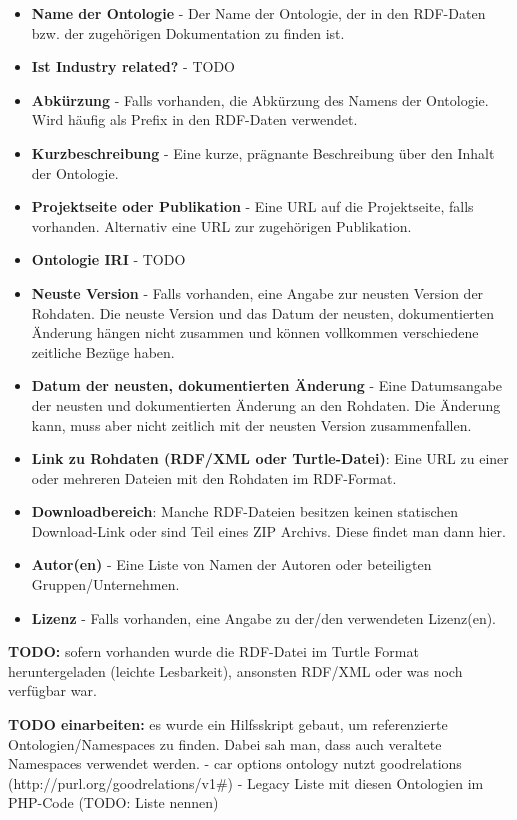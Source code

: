 \documentclass{article}
\begin{document}
\begin{itemize}
    \item \textbf{Name der Ontologie} - Der Name der Ontologie, der in den RDF-Daten bzw. der zugehörigen Dokumentation zu finden ist.
    \item \textbf{Ist Industry related?} - TODO
    \item \textbf{Abkürzung} - Falls vorhanden, die Abkürzung des Namens der Ontologie. Wird häufig als Prefix in den RDF-Daten verwendet.
    \item \textbf{Kurzbeschreibung} - Eine kurze, prägnante Beschreibung über den Inhalt der Ontologie.
    \item \textbf{Projektseite oder Publikation} - Eine URL auf die Projektseite, falls vorhanden. Alternativ eine URL zur zugehörigen Publikation.
    \item \textbf{Ontologie IRI} - TODO
    \item \textbf{Neuste Version} - Falls vorhanden, eine Angabe zur neusten Version der Rohdaten. Die neuste Version und das Datum der neusten, dokumentierten Änderung hängen nicht zusammen und können vollkommen verschiedene zeitliche Bezüge haben.
    \item \textbf{Datum der neusten, dokumentierten Änderung} - Eine Datumsangabe der neusten und dokumentierten Änderung an den Rohdaten. Die Änderung kann, muss aber nicht zeitlich mit der neusten Version zusammenfallen.
    \item \textbf{Link zu Rohdaten (RDF/XML oder Turtle-Datei)}: Eine URL zu einer oder mehreren Dateien mit den Rohdaten im RDF-Format.
    \item \textbf{Downloadbereich}: Manche RDF-Dateien besitzen keinen statischen Download-Link oder sind Teil eines ZIP Archivs. Diese findet man dann hier.
    \item \textbf{Autor(en)} - Eine Liste von Namen der Autoren oder beteiligten Gruppen/Unternehmen.
    \item \textbf{Lizenz} - Falls vorhanden, eine Angabe zu der/den verwendeten Lizenz(en).
\end{itemize}

\textbf{TODO:} sofern vorhanden wurde die RDF-Datei im Turtle Format heruntergeladen (leichte Lesbarkeit), ansonsten RDF/XML oder was noch verfügbar war.

\textbf{TODO einarbeiten:} es wurde ein Hilfsskript gebaut, um referenzierte Ontologien/Namespaces zu finden. Dabei sah man, dass auch veraltete Namespaces verwendet werden.
- car options ontology nutzt goodrelations (http://purl.org/goodrelations/v1\#) - Legacy Liste mit diesen Ontologien im PHP-Code (TODO: Liste nennen)
\end{document}
